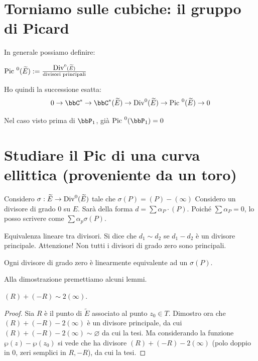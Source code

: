 \section{Torniamo sulle cubiche: il gruppo di Picard}
In generale possiamo definire:

\begin{definizione}
$\mbox{Pic }^0(\widetilde{E}) := \frac{\mbox{Div}^0(\widetilde{E})}{\text{divisori principali}}$
\end{definizione}

\begin{osservazione}
Ho quindi la successione esatta:
$$0 \rightarrow \bbC^* \rightarrow \bbC^*(\widetilde{E}) \rightarrow \Div^0(\widetilde{E})\rightarrow \Pic^0(\widetilde{E})\rightarrow 0$$
\end{osservazione}

Nel caso visto prima di $\bbP_1$, già $\Pic^0(\bbP_1)=0$


\section{Studiare il Pic di una curva ellittica (proveniente da un toro)}

Considero $\sigma : \widetilde E \rightarrow \mbox{Div}^0(\widetilde E)$ tale che $\sigma(P)=(P)-(\infty)$
Considero un divisore di grado $0$ su $E$. Sarà della forma $d = \sum\alpha_P\cdot(P)$.
Poiché $\sum \alpha_P=0$, lo posso scrivere come $\sum\alpha_p \sigma(P)$.

\begin{definizione}
Equivalenza lineare tra divisori. Si dice che $d_1 \sim d_2$ se $d_1-d_2$ è un divisore principale. Attenzione! Non tutti i divisori di grado zero sono principali.
\end{definizione}

\begin{teorema}
  \label{teorema_divisori_semplici}
Ogni divisore di grado zero è linearmente equivalente ad un $\sigma(P)$.
\end{teorema}

Alla dimostrazione premettiamo alcuni lemmi. 
\begin{lemma}
  \label{lemma_equiv_lin}
$(R) + (-R) \sim 2(\infty)$.
\end{lemma}
\begin{proof}
Sia $R$ è il punto di $\widetilde E$ associato al punto $z_0 \in T$.
Dimostro ora che $(R)+(-R)-2(\infty)$ è un divisore principale, da cui $(R)+(-R)-2(\infty) \sim \varnothing$ da cui la tesi.
Ma considerando la funzione $\wp(z)-\wp(z_0)$ si vede che ha divisore $(R)+(-R)-2(\infty)$ (polo doppio in $0$, zeri semplici in $R,-R$), da cui la tesi.
\end{proof}

